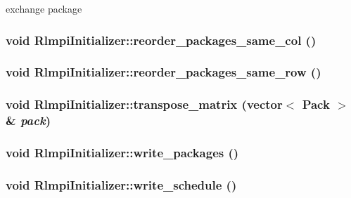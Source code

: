 exchange package \hypertarget{classRlmpiInitializer_a41a594eb50f4f0e3b44a0a28eb0af396}{
\subsubsection[{reorder\_\-packages\_\-same\_\-col}]{\setlength{\rightskip}{0pt plus 5cm}void RlmpiInitializer::reorder\_\-packages\_\-same\_\-col ()}}
\label{classRlmpiInitializer_a41a594eb50f4f0e3b44a0a28eb0af396}
\hypertarget{classRlmpiInitializer_a0ff3e38b34bebb951b36107951073c70}{
\subsubsection[{reorder\_\-packages\_\-same\_\-row}]{\setlength{\rightskip}{0pt plus 5cm}void RlmpiInitializer::reorder\_\-packages\_\-same\_\-row ()}}
\label{classRlmpiInitializer_a0ff3e38b34bebb951b36107951073c70}
\hypertarget{classRlmpiInitializer_a0c2417a7be3b73b1589778b9dba76143}{
\subsubsection[{transpose\_\-matrix}]{\setlength{\rightskip}{0pt plus 5cm}void RlmpiInitializer::transpose\_\-matrix (vector$<$ Pack $>$ \& {\em pack})}}
\label{classRlmpiInitializer_a0c2417a7be3b73b1589778b9dba76143}
\hypertarget{classRlmpiInitializer_a1d5c7addc4a0d39152ac81ebec7726bb}{
\subsubsection[{write\_\-packages}]{\setlength{\rightskip}{0pt plus 5cm}void RlmpiInitializer::write\_\-packages ()}}
\label{classRlmpiInitializer_a1d5c7addc4a0d39152ac81ebec7726bb}
\hypertarget{classRlmpiInitializer_a97d48ddb124af75c09509e63cc327246}{
\subsubsection[{write\_\-schedule}]{\setlength{\rightskip}{0pt plus 5cm}void RlmpiInitializer::write\_\-schedule ()}}
\label{classRlmpiInitializer_a97d48ddb124af75c09509e63cc327246}


